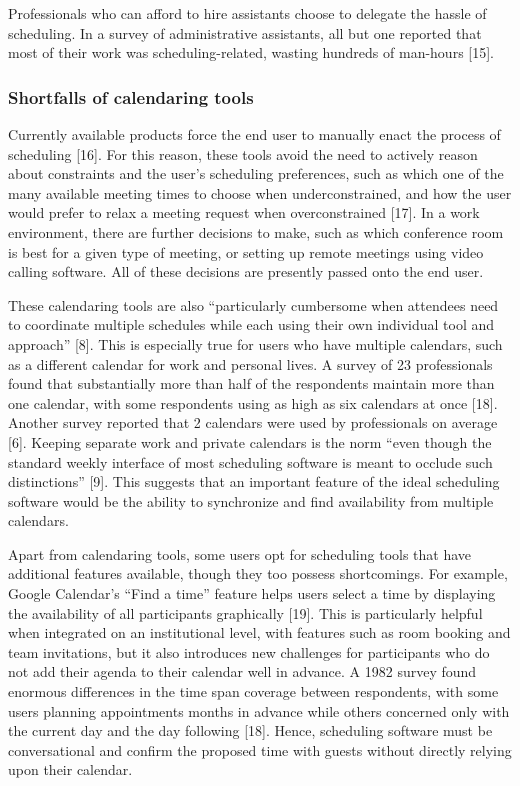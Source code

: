 \documentclass{article}
\begin{document}
Professionals who can afford to hire assistants choose to delegate the hassle of scheduling. In a survey of administrative assistants, all but one reported that most of their work was scheduling-related, wasting hundreds of man-hours [15].

\subsubsection{Shortfalls of calendaring tools}

Currently available products force the end user to manually enact the process of scheduling [16]. For this reason, these tools avoid the need to actively reason about constraints and the user’s scheduling preferences, such as which one of the many available meeting times to choose when underconstrained, and how the user would prefer to relax a meeting request when overconstrained [17]. In a work environment, there are further decisions to make, such as which conference room is best for a given type of meeting, or setting up remote meetings using video calling software. All of these decisions are presently passed onto the end user.

These calendaring tools are also “particularly cumbersome when attendees need to coordinate multiple schedules while each using their own individual tool and approach” [8]. This is especially true for users who have multiple calendars, such as a different calendar for work and personal lives. A survey of 23 professionals found that substantially more than half of the respondents maintain more than one calendar, with some respondents using as high as six calendars at once [18]. Another survey reported that 2 calendars were used by professionals on average [6]. Keeping separate work and private calendars is the norm “even though the standard weekly interface of most scheduling software is meant to occlude such distinctions” [9]. This suggests that an important feature of the ideal scheduling software would be the ability to synchronize and find availability from multiple calendars.

Apart from calendaring tools, some users opt for scheduling tools that have additional features available, though they too possess shortcomings. For example, Google Calendar’s “Find a time” feature helps users select a time by displaying the availability of all participants graphically [19]. This is particularly helpful when integrated on an institutional level, with features such as room booking and team invitations, but it also introduces new challenges for participants who do not add their agenda to their calendar well in advance. A 1982 survey found enormous differences in the time span coverage between respondents, with some users planning appointments months in advance while others concerned only with the current day and the day following [18]. Hence, scheduling software must be conversational and confirm the proposed time with guests without directly relying upon their calendar.
\end{document}
